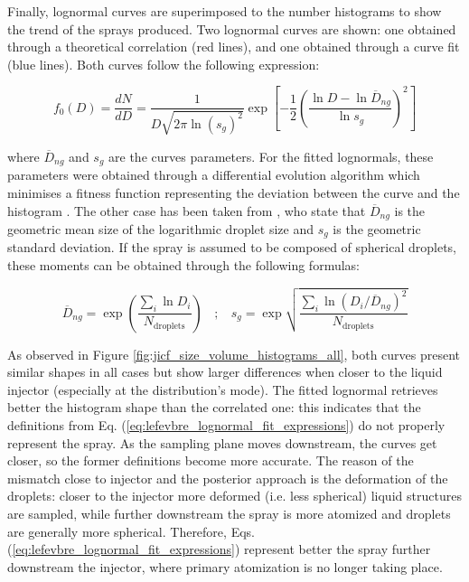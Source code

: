 Finally, lognormal curves are superimposed to the number histograms to show the trend of the sprays produced. Two lognormal curves are shown: one obtained through a theoretical correlation (red lines), and one obtained through a curve fit (blue lines). Both curves follow the following expression:

\begin{equation}
\label{eq:ch5_f0_lognormal_distr_expression}
 f_0 \left( D \right) = \frac{d N}{d D} =  \frac{1}{D  \sqrt{2 \pi \ln \left( s_g \right)^2}} \exp \left[ - \frac{1}{2 } \left( \frac{\ln D - \ln \overline{D}_{ng}}{\ln s_g}   \right)^2 \right]
\end{equation}

where $\overline{D}_{ng}$ and $s_g$ are the curves parameters. For the fitted lognormals, these parameters were obtained through a differential evolution algorithm which minimises a fitness function representing the deviation between the curve and the histogram . The other case has been taken from  , who state that $\overline{D}_{ng}$ is the geometric mean size of the logarithmic droplet size and $s_g$ is the geometric standard deviation. If the spray is assumed to be composed of spherical droplets, these moments can be obtained through the following formulas: 

%
\begin{equation}
\label{eq:lefevbre_lognormal_fit_expressions}
\overline{D}_{ng} = \exp \left(  \frac{\sum_i \ln D_i }{N_\mathrm{droplets}} \right)  ~~~~ ; ~~~~ 
s_g = \exp \sqrt{  \frac{\sum_i \ln \left( D_i / \overline{D}_{ng} \right) ^2 }{N_\mathrm{droplets}} }
\end{equation}

As observed in Figure \ref{fig:jicf_size_volume_histograms_all}, both curves present similar shapes in all cases but show larger differences when closer to the liquid injector (especially at the distribution's mode). The fitted lognormal retrieves better the histogram shape than the correlated one: this indicates that the definitions from Eq. (\ref{eq:lefevbre_lognormal_fit_expressions}) do not properly represent the spray.  As the sampling plane moves downstream, the curves get closer, so the former definitions become more accurate. The reason of the mismatch close to injector and the posterior approach is the deformation of the droplets: closer to the injector more deformed (i.e. less spherical) liquid structures are sampled, while further downstream the spray is more atomized and droplets are generally more spherical. Therefore, Eqs. (\ref{eq:lefevbre_lognormal_fit_expressions}) represent better the spray further downstream the injector, where primary atomization is no longer taking place.



